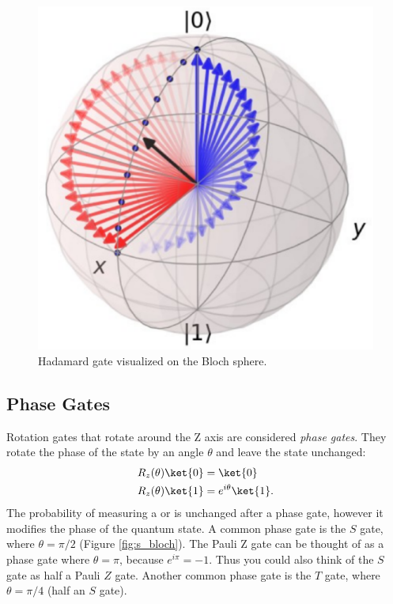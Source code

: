 \begin{figure}[ht]
  \centering
  \includegraphics[scale=0.17]{images/hadamard_gate.eps}
  \vspace{1mm}
  \caption{Hadamard gate visualized on the Bloch sphere.}
  \label{fig:hadamard_bloch}
\end{figure}

\subsection{Phase Gates}
Rotation gates that rotate around the Z axis are considered \emph{phase gates}. They rotate the phase of the  state by an angle $\theta$ and leave the  state unchanged:
\begin{equation}
  \begin{aligned}
    R_z(\theta) \ket{0} &= \ket{0} \\
    R_z(\theta) \ket{1} &= e^{i\theta}\ket{1}.
  \end{aligned}
\end{equation}
The probability of measuring a  or  is unchanged after a phase gate, however it modifies the phase of the quantum state. A common phase gate is the $S$ gate, where $\theta = \pi/2$ (Figure \ref{fig:s_bloch}). The Pauli Z gate can be thought of as a phase gate where $\theta = \pi$, because $e^{i\pi} = -1$. Thus you could also think of the $S$ gate as half a Pauli $Z$ gate. Another common phase gate is the $T$ gate, where $\theta = \pi/4$ (half an $S$ gate).

